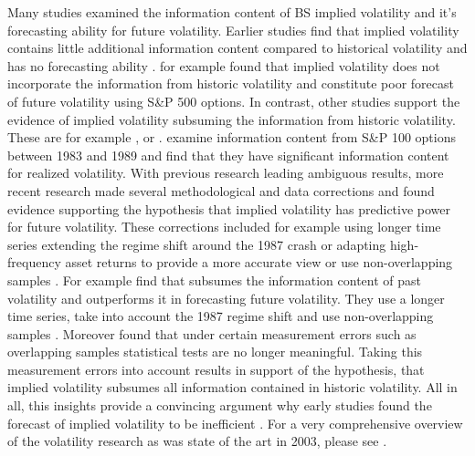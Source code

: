 Many studies examined the information content of \gls{BS} implied volatility and it's forecasting ability for future volatility. Earlier studies find that implied volatility contains little additional information content compared to historical volatility and has no forecasting ability \parencite{jiang2003}. \textcite{canina1993} for example found that implied volatility does not incorporate the information from historic volatility and constitute poor forecast of future volatility using S\&P 500 options. In contrast, other studies  support the evidence of implied volatility subsuming the information from historic volatility. These are for example \textcite{day1992}, \textcite{lamoureux1993} or \textcite{jorion1995}. \textcite{day1992} examine information content from S\&P 100 options between 1983 and 1989 and find that they have significant information content for realized volatility. With previous research leading ambiguous results, more recent research made several methodological and data corrections and found evidence supporting the hypothesis that implied volatility has predictive power for future volatility. These corrections included for example using longer time series extending the regime shift around the 1987 crash or adapting high-frequency asset returns to provide a more accurate view or use non-overlapping samples \parencite{jiang2003}. For example \textcite{christensen1998} find that subsumes the information content of past volatility and outperforms it in forecasting future volatility. They use a longer time series, take into account the 1987 regime shift and use non-overlapping samples \parencite{jiang2003}. Moreover \textcite{christensen2001} found that under certain measurement errors such as overlapping samples statistical tests are no longer meaningful. Taking this measurement errors into account results in support of the hypothesis, that implied volatility subsumes all information contained in historic volatility. All in all, this insights provide a convincing argument why early studies found the forecast of implied volatility to be inefficient \parencite{jiang2003}. For a very comprehensive overview of the volatility research as was state of the art in 2003, please see \textcite{poon2003}. \\
%

